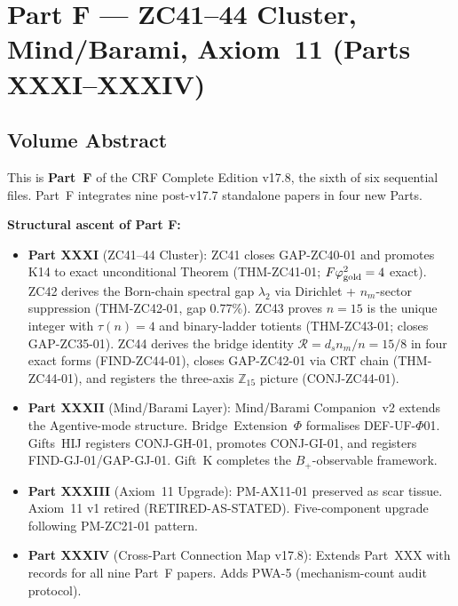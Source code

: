 \documentclass[11pt, a4paper]{article}
\begin{document}
\vfill

\section{Part F --- ZC41--44 Cluster, Mind/Barami, Axiom~11
  (Parts XXXI--XXXIV)}

\subsection*{Volume Abstract}

\begin{volumebox}[title={Part F --- CRF Complete Edition v17.8
  (Parts XXXI--XXXIV)}]
\sloppy
This is \textbf{Part~F} of the CRF Complete Edition v17.8, the sixth
of six sequential files. Part~F integrates nine post-v17.7 standalone
papers in four new Parts.

\textbf{Structural ascent of Part F:}
\begin{itemize}[noitemsep,leftmargin=1.5em]
  \item \textbf{Part XXXI} (ZC41--44 Cluster):
    ZC41 closes GAP-ZC40-01 and promotes K14 to exact unconditional
    Theorem (THM-ZC41-01; $F\varphi_{\rm gold}^2 = 4$ exact).
    ZC42 derives the Born-chain spectral gap $\lambda_2$ via
    Dirichlet + $n_m$-sector suppression (THM-ZC42-01, gap 0.77\%).
    ZC43 proves $n=15$ is the unique integer with $\tau(n)=4$ and
    binary-ladder totients (THM-ZC43-01; closes GAP-ZC35-01).
    ZC44 derives the bridge identity
    $\mathcal{R} = d_s n_m/n = 15/8$ in four exact forms
    (FIND-ZC44-01), closes GAP-ZC42-01 via CRT chain
    (THM-ZC44-01), and registers the three-axis
    $\mathbb{Z}_{15}$ picture (CONJ-ZC44-01).
  \item \textbf{Part XXXII} (Mind/Barami Layer):
    Mind/Barami Companion~v2 extends the Agentive-mode structure.
    Bridge~Extension~$\Phi$ formalises DEF-UF-$\Phi$01.
    Gifts~HIJ registers CONJ-GH-01, promotes CONJ-GI-01,
    and registers FIND-GJ-01/GAP-GJ-01.
    Gift~K completes the $B_+$-observable framework.
  \item \textbf{Part XXXIII} (Axiom~11 Upgrade):
    PM-AX11-01 preserved as scar tissue. Axiom~11 v1 retired
    (RETIRED-AS-STATED). Five-component upgrade following
    PM-ZC21-01 pattern.
  \item \textbf{Part XXXIV} (Cross-Part Connection Map v17.8):
    Extends Part~XXX with records for all nine Part~F papers.
    Adds PWA-5 (mechanism-count audit protocol).
\end{itemize}


\end{volumebox}
\end{document}

